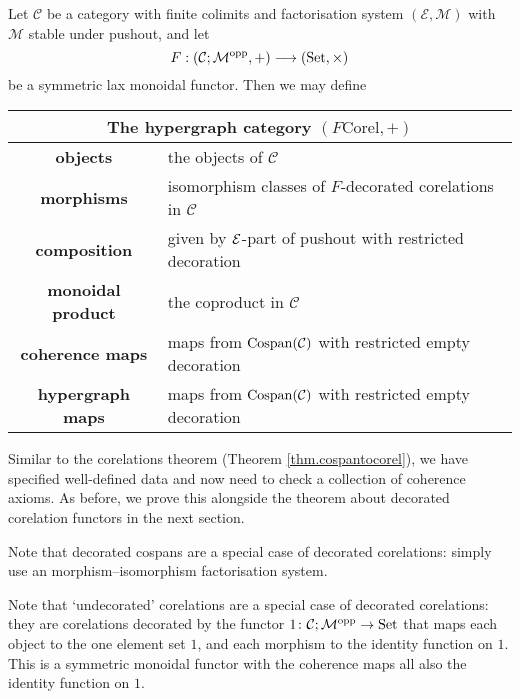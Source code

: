\begin{theorem} \label{thm.fcorel}
  Let $\mathcal C$ be a category with finite colimits and factorisation system
  $(\mathcal E, \mathcal M)$ with $\mathcal M$ stable under pushout, and let 
  \[
    F: (\mathcal C;\mathcal M^{\mathrm{opp}},+) \longrightarrow (\mathrm{Set}, \times)
  \]
  be a symmetric lax monoidal functor.  Then we may define 
  \begin{center}
    \begin{tabular}{| c | p{} |}
      \hline
      \multicolumn{2}{|c|}{The hypergraph category $(F\mathrm{Corel},+)$} \\
      \hline
      \textbf{objects} & the objects of $\mathcal C$ \\ 
      \textbf{morphisms} & isomorphism classes of $F$-decorated corelations in
      $\mathcal C$\\ 
      \textbf{composition} & given by $\mathcal E$-part of pushout with restricted
      decoration  \\
      \textbf{monoidal product} & the coproduct in $\mathcal C$  \\
      \textbf{coherence maps} & maps from $\operatorname{{Cospan}}(\mathcal C)$ with restricted empty
      decoration \\
      \textbf{hypergraph maps} & maps from $\operatorname{{Cospan}}(\mathcal C)$ with restricted empty
      decoration \\
      \hline
    \end{tabular}
  \end{center}
\end{theorem}
Similar to the corelations theorem (Theorem \ref{thm.cospantocorel}), we have
specified well-defined data and now need to check a collection of coherence
axioms. As before, we prove this alongside the theorem about decorated
corelation functors in the next section.

\begin{example}
  Note that decorated cospans are a special case of decorated corelations:
  simply use an morphism--isomorphism factorisation system.
\end{example}

\begin{example} \label{ex.undeccorel}
  Note that `undecorated' corelations are a special case of decorated
  corelations: they are corelations decorated by the functor $1{\colon} \mathcal C;\mathcal
  M^{\mathrm{opp}} \to \mathrm{Set}$ that maps each object to the one element set $1$, and each
  morphism to the identity function on $1$. This is a symmetric monoidal functor
  with the coherence maps all also the identity function on $1$.
\end{example}


